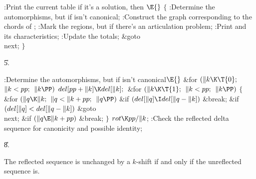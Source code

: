 \fi

\B{}:Print the current  table if it's a solution, then \X${}\E{}$\6
${}\{{}$\1\6
:Determine the automorphisms, but  if 
isn't canonical\X;\6
:Construct the graph corresponding to the chords of \X;\6
:Mark the regions, but  if there's an articulation
problem\X;\6
:Print  and its characteristics\X;\6
:Update the totals\X;\6
\&{goto} \\{next};\6
\4${}\}{}$\2\par
\U5.\fi

\B{}:Determine the automorphisms, but  if  isn't canonical\X${}\E{}$\6
\&{for} ${}(\|k\K\T{0};{}$ ${}\|k<\\{pp};{}$ ${}\|k\PP){}$\1\5
${}\\{del}[\\{pp}+\|k]\K\\{del}[\|k];{}$\2\6
\&{for} ${}(\|k\K\T{1};{}$ ${}\|k<\\{pp};{}$ ${}\|k\PP){}$\5
${}\{{}$\1\6
\&{for} ${}(\|q\K\|k;{}$ ${}\|q<\|k+\\{pp};{}$ ${}\|q\PP){}$\1\6
\&{if} ${}(\\{del}[\|q]\I\\{del}[\|q-\|k]){}$\1\5
\&{break};\2\2\6
\&{if} ${}(\\{del}[\|q]<\\{del}[\|q-\|k]){}$\1\5
\&{goto} \\{next};\2\6
\&{if} ${}(\|q\E\|k+\\{pp}){}$\1\5
\&{break};\2\6
\4${}\}{}$\2\6
${}\\{rot}\K\\{pp}/\|k{}$;\6
:Check the reflected delta sequence for canonicity and possible identity\X;%
\par
\U8.\fi

The reflected sequence is unchanged by a $k$-shift if and only if the
unreflected sequence is.

